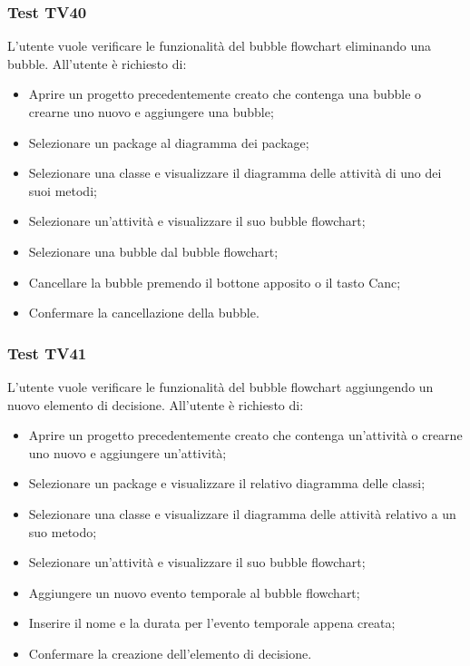\documentclass[../PianoDiQualifica.tex]{subfiles}
\begin{document}
	
	\subsubsection{Test TV40} 
	L'utente vuole verificare le funzionalità del bubble flowchart eliminando una bubble. 
	All'utente è richiesto di: 
	\begin{itemize} 
		\item Aprire un progetto precedentemente creato che contenga una bubble o crearne uno nuovo e aggiungere una bubble;
		\item Selezionare un package al diagramma dei package; 
		\item Selezionare una classe e visualizzare il diagramma delle attività di uno dei suoi metodi; 
		\item Selezionare un'attività e visualizzare il suo bubble flowchart; 
		\item Selezionare una bubble dal bubble flowchart; 
		\item Cancellare la bubble premendo il bottone apposito o il tasto Canc; 
		\item Confermare la cancellazione della bubble. 
	\end{itemize} 
	
	
	\subsubsection{Test TV41} 
	L'utente vuole verificare le funzionalità del bubble flowchart aggiungendo un nuovo elemento di decisione. 
	All'utente è richiesto di: 
	\begin{itemize} 
		\item Aprire un progetto precedentemente creato che contenga un'attività o crearne uno nuovo e aggiungere un'attività;
		\item Selezionare un package e visualizzare il relativo diagramma delle classi; 
		\item Selezionare una classe e visualizzare il diagramma delle attività relativo a un suo metodo; %
		\item Selezionare un'attività e visualizzare il suo bubble flowchart; 
		\item Aggiungere un nuovo evento temporale al bubble flowchart; 
		\item Inserire il nome e la durata per l'evento temporale appena creata; %
		\item Confermare la creazione dell'elemento di decisione. 
	\end{itemize} 
	
\end{document}
